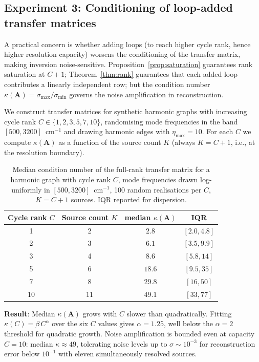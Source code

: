 \documentclass[11pt,twocolumn,a4paper]{article}
\theoremstyle{definition}
\theoremstyle{remark}
\newcommand{\Cmat}{\mathbf{A}}
\begin{document}
\subsection{Experiment 3: Conditioning of loop-added transfer matrices}
\label{sec:exp_conditioning}

A practical concern is whether adding loops (to reach higher cycle rank, hence higher resolution capacity) worsens the conditioning of the transfer matrix, making inversion noise-sensitive. Proposition~\ref{prop:saturation} guarantees rank saturation at $C + 1$; Theorem~\ref{thm:rank} guarantees that each added loop contributes a linearly independent row; but the condition number $\kappa(\Cmat) = \sigma_{\max}/\sigma_{\min}$ governs the noise amplification in reconstruction.

We construct transfer matrices for synthetic harmonic graphs with increasing cycle rank $C \in \{1, 2, 3, 5, 7, 10\}$, randomising mode frequencies in the band $[500, 3200]$~cm$^{-1}$ and drawing harmonic edges with $\eta_{\max} = 10$. For each $C$ we compute $\kappa(\Cmat)$ as a function of the source count $K$ (always $K = C+1$, i.e., at the resolution boundary).

\begin{table}[H]
\centering\small
\caption{Median condition number of the full-rank transfer matrix for a harmonic graph with cycle rank $C$, mode frequencies drawn log-uniformly in $[500, 3200]$~cm$^{-1}$, 100 random realisations per $C$, $K = C + 1$ sources. IQR reported for dispersion.}
\label{tab:conditioning}
\begin{tabular}{cccc}
\toprule
Cycle rank $C$ & Source count $K$ & median $\kappa(\Cmat)$ & IQR\\
\midrule
1  & 2  & $2.8$  & $[2.0, 4.8]$\\
2  & 3  & $6.1$  & $[3.5, 9.9]$\\
3  & 4  & $8.6$  & $[5.8, 14]$\\
5  & 6  & $18.6$ & $[9.5, 35]$\\
7  & 8  & $29.8$ & $[16, 50]$\\
10 & 11 & $49.1$ & $[33, 77]$\\
\bottomrule
\end{tabular}
\end{table}

\textbf{Result}: Median $\kappa(\Cmat)$ grows with $C$ slower than quadratically. Fitting $\kappa(C) = \beta\, C^\alpha$ over the six $C$ values gives $\alpha = 1.25$, well below the $\alpha = 2$ threshold for quadratic growth. Noise amplification is bounded even at capacity $C = 10$: median $\kappa \approx 49$, tolerating noise levels up to $\sigma \sim 10^{-3}$ for reconstruction error below $10^{-1}$ with eleven simultaneously resolved sources.
\end{document}
